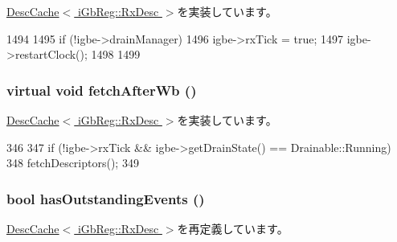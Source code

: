 \hyperlink{classIGbE_1_1DescCache_a9b931707aadb26e13262c50e0dd87006}{DescCache$<$ iGbReg::RxDesc $>$}を実装しています。


\begin{DoxyCode}
1494 {
1495     if (!igbe->drainManager) {
1496         igbe->rxTick = true;
1497         igbe->restartClock();
1498     }
1499 }
\end{DoxyCode}
\hypertarget{classIGbE_1_1RxDescCache_abb8070fbcfa38a9697d92bbc4a0b6505}{
\subsubsection[{fetchAfterWb}]{\setlength{\rightskip}{0pt plus 5cm}virtual void fetchAfterWb ()}}
\label{classIGbE_1_1RxDescCache_abb8070fbcfa38a9697d92bbc4a0b6505}


\hyperlink{classIGbE_1_1DescCache_abe568c102619a35d2aa1a37c64dff086}{DescCache$<$ iGbReg::RxDesc $>$}を実装しています。


\begin{DoxyCode}
346                                     {
347             if (!igbe->rxTick && igbe->getDrainState() == Drainable::Running)
348                 fetchDescriptors();
349         }
\end{DoxyCode}
\hypertarget{classIGbE_1_1RxDescCache_a2587421ae644a9474416e5a5b63ccbca}{
\subsubsection[{hasOutstandingEvents}]{\setlength{\rightskip}{0pt plus 5cm}bool hasOutstandingEvents ()}}
\label{classIGbE_1_1RxDescCache_a2587421ae644a9474416e5a5b63ccbca}


\hyperlink{classIGbE_1_1DescCache_a09989bc9720a200c8164dc1ef109d70b}{DescCache$<$ iGbReg::RxDesc $>$}を再定義しています。


